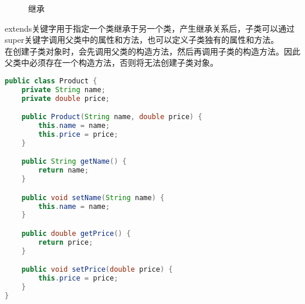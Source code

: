 \begin{figure}[H]
    \centering
    \caption{继承}
\end{figure}

extends关键字用于指定一个类继承于另一个类，产生继承关系后，子类可以通过super关键字调用父类中的属性和方法，也可以定义子类独有的属性和方法。\\

在创建子类对象时，会先调用父类的构造方法，然后再调用子类的构造方法。因此父类中必须存在一个构造方法，否则将无法创建子类对象。\\


\begin{lstlisting}[language=Java]
public class Product {
    private String name;
    private double price;

    public Product(String name, double price) {
        this.name = name;
        this.price = price;
    }

    public String getName() {
        return name;
    }

    public void setName(String name) {
        this.name = name;
    }

    public double getPrice() {
        return price;
    }

    public void setPrice(double price) {
        this.price = price;
    }
}
\end{lstlisting}

